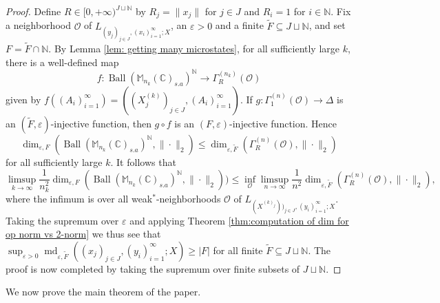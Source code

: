 \documentclass[10pt]{amsart}
\theoremstyle{definition}
\numberwithin{equation}{section}
\newcommand{\bC}{{\mathbb C}}
\newcommand{\bM}{{\mathbb M}}
\newcommand{\bN}{{\mathbb N}}
\DeclareMathOperator{\Ball}{Ball}
\DeclareMathOperator{\md}{md}
\begin{document}
\begin{proof}
Define $R\in [0,+\infty)^{J\sqcup \bN}$ by $R_{j}=\|x_{j}\|$ for $j\in J$ and $R_{i}=1$ for $i\in \bN$. 
Fix a neighborhood $\mathcal{O}$ of $L_{(y_{j})_{j\in J},(x_{i})_{i=1}^{\infty};X}$, an $\varepsilon>0$ and a finite $\widetilde{F}\subseteq J\sqcup \bN$, and set $F=\widetilde{F}\cap \bN$. By Lemma \ref{lem: getting many microstates}, for all sufficiently large $k$, there is a well-defined map
\[f\colon \Ball(\bM_{n_{k}}(\bC)_{s.a})^{\bN}\to \Gamma_{R}^{(n_{k})}(\mathcal{O})\]
given by $f((A_{i})_{i=1}^{\infty})=((X^{(k)}_{j})_{j\in J},(A_{i})_{i=1}^{\infty})$.
If $g\colon \Gamma_{1}^{(n)}(\mathcal{O})\to \Delta$ is an $(\widetilde{F},\varepsilon)$-injective function, then $g\circ f$ is an $(F,\varepsilon)$-injective function. Hence
\[\dim_{\varepsilon,F}(\Ball(\bM_{n_{k}}(\bC)_{s.a})^{\bN},\|\cdot\|_{2})\leq \dim_{\varepsilon,\widetilde{F}}(\Gamma_{R}^{(n)}(\mathcal{O}),\|\cdot\|_{2})\]
for all sufficiently large $k$. It follows that 
\[\limsup_{k\to\infty}\frac{1}{n_{k}^{2}}\dim_{\varepsilon,F}(\Ball(\bM_{n_{k}}(\bC)_{s.a})^{\bN},\|\cdot\|_{2}))\leq \inf_{\mathcal{O}}\limsup_{n\to\infty}\frac{1}{n^{2}}\dim_{\varepsilon,\widetilde{F}}(\Gamma_{R}^{(n)}(\mathcal{O}),\|\cdot\|_{2}),\]
where the infimum is over all weak$^{*}$-neighborhoods $\mathcal{O}$ of $L_{(X^{(k)_{j}}))_{j\in J},(y_{i})_{i=1}^{\infty};X}$. 
Taking the supremum over $\varepsilon$ and applying Theorem \ref{thm:computation of dim for op norm vs 2-norm} we thus see that $\sup_{\varepsilon>0}\md_{\varepsilon,\widetilde{F}}((x_{j})_{j\in J},(y_{i})_{i=1}^{\infty};X)\geq |F|$ for all finite $\widetilde{F}\subseteq J\sqcup \bN$. The proof is now completed by taking the supremum over finite subsets of $J\sqcup \bN$. 






\end{proof}


We now prove the main theorem of the paper.
\end{document}
